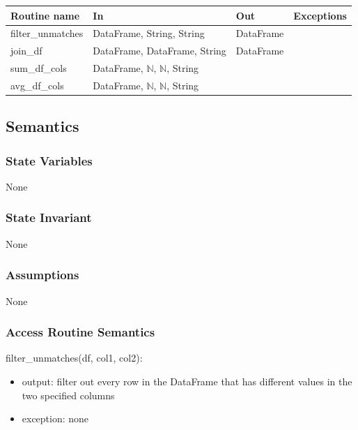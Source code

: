 \documentclass[12pt]{article}
\begin{document}
\begin{tabular}{| l | l | l | p{5cm} |}
\hline
\textbf{Routine name} & \textbf{In} & \textbf{Out} & \textbf{Exceptions}\\
\hline
filter\_unmatches & DataFrame, String, String & DataFrame & \\
\hline
join\_df & DataFrame, DataFrame, String & DataFrame & \\
\hline
sum\_df\_cols & DataFrame, $\mathbb{N}$, $\mathbb{N}$, String & & \\
\hline
avg\_df\_cols & DataFrame, $\mathbb{N}$, $\mathbb{N}$, String & & \\
\hline

\end{tabular}

\subsection* {Semantics}

\subsubsection* {State Variables}

None

\subsubsection* {State Invariant}

None

\subsubsection* {Assumptions}

None

\subsubsection* {Access Routine Semantics}

\noindent filter\_unmatches(df, col1, col2):
\begin{itemize}
    \item output: filter out every row in the DataFrame that has different values in the two specified columns
    \item exception: none
\end{itemize}
\end{document}

